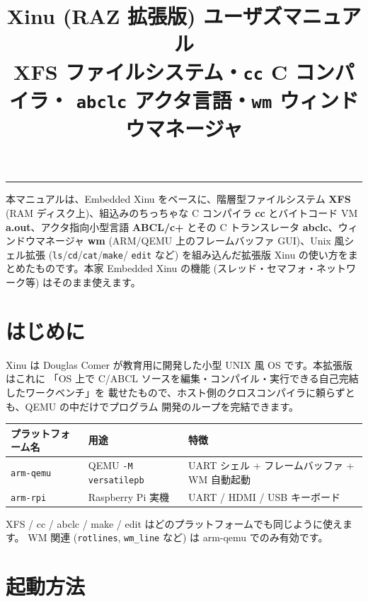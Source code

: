 \documentclass[a4paper,11pt]{ltjsarticle}
\title{\textbf{Xinu (RAZ 拡張版) ユーザズマニュアル}\\[3pt]
  \large XFS ファイルシステム・\texttt{cc} C コンパイラ・%
  \texttt{abclc} アクタ言語・\texttt{wm} ウィンドウマネージャ}
\author{}
\date{}
\begin{document}
\maketitle
\vspace{-2.0em}
\begin{center}\rule{0.9\textwidth}{0.4pt}\end{center}

本マニュアルは、Embedded Xinu をベースに、階層型ファイルシステム \textbf{XFS}
(RAM ディスク上)、組込みのちっちゃな C コンパイラ \textbf{cc} とバイトコード VM
\textbf{a.out}、アクタ指向小型言語 \textbf{ABCL/c+} とその C トランスレータ
\textbf{abclc}、ウィンドウマネージャ \textbf{wm} (ARM/QEMU 上のフレームバッファ
GUI)、Unix 風シェル拡張 (\texttt{ls}/\texttt{cd}/\texttt{cat}/\texttt{make}/%
\texttt{edit} など) を組み込んだ拡張版 Xinu の使い方をまとめたものです。本家
Embedded Xinu の機能 (スレッド・セマフォ・ネットワーク等) はそのまま使えます。

{\small\tableofcontents}
\bigskip

\section{はじめに}
Xinu は Douglas Comer が教育用に開発した小型 UNIX 風 OS です。本拡張版はこれに
「OS 上で C/ABCL ソースを編集・コンパイル・実行できる自己完結したワークベンチ」を
載せたもので、ホスト側のクロスコンパイラに頼らずとも、QEMU の中だけでプログラム
開発のループを完結できます。

\begin{center}\footnotesize
\begin{tabular}{@{}l l p{6.6cm}@{}}
\toprule
\textbf{プラットフォーム名} & \textbf{用途} & \textbf{特徴}\\
\midrule
\verb|arm-qemu| & QEMU \verb|-M versatilepb| & UART シェル + フレームバッファ + WM 自動起動\\
\verb|arm-rpi|  & Raspberry Pi 実機 & UART / HDMI / USB キーボード\\
\bottomrule
\end{tabular}
\end{center}
XFS / cc / abclc / make / edit はどのプラットフォームでも同じように使えます。
WM 関連 (\verb|rotlines|, \verb|wm_line| など) は arm-qemu でのみ有効です。

\section{起動方法}
\end{document}
